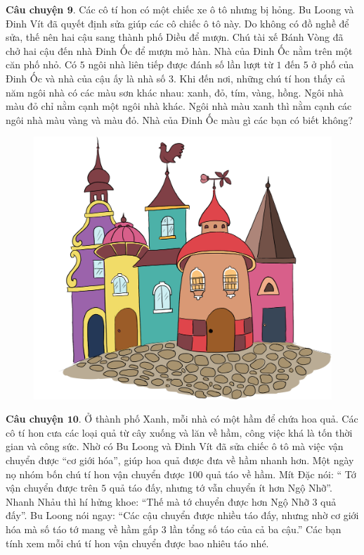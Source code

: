 	\vskip 0.1cm
	\textbf{\color{toancuabi}Câu chuyện $\pmb{9.}$} Các cô tí hon có một chiếc xe ô tô nhưng bị hỏng. Bu Loong và Đinh Vít đã quyết định sửa giúp các cô chiếc ô tô này. Do  không có đồ nghề để sửa, thế nên hai cậu sang thành phố Diều để mượn. Chú tài xế Bánh Vòng đã chở hai cậu đến nhà Đinh Ốc để mượn mỏ hàn. Nhà của Đinh Ốc nằm trên một căn phố nhỏ. Có $5$ ngôi nhà liên tiếp được đánh số lần lượt từ $1$ đến $5$ ở phố của Đinh Ốc và nhà của cậu ấy là nhà số $3$. Khi đến nơi, những chú tí hon thấy cả năm ngôi nhà có các màu sơn khác nhau: xanh, đỏ, tím, vàng, hồng. Ngôi nhà màu đỏ chỉ nằm cạnh một ngôi nhà khác. Ngôi nhà màu xanh thì nằm cạnh các ngôi nhà màu vàng và màu đỏ. Nhà của Đinh Ốc màu gì các bạn có biết không?
		\begin{figure}[H]
		\centering
		\vspace*{-5pt}
		\captionsetup{labelformat= empty, justification=centering}
		\includegraphics[width=0.55\linewidth]{Hinh24_NhaDinhOc}
		\vspace*{-10pt}
	\end{figure}
	\textbf{\color{toancuabi}Câu chuyện $\pmb{10.}$} Ở thành phố Xanh, mỗi nhà có một hầm để chứa hoa quả. Các cô tí hon cưa các loại quả từ cây xuống và lăn về hầm, công việc khá là tốn thời gian và công sức. Nhờ có Bu Loong và Đinh Vít đã sửa chiếc ô tô mà việc vận chuyển được “cơ giới hóa”, giúp hoa quả được đưa về hầm nhanh hơn. Một ngày nọ nhóm bốn chú tí hon vận chuyển được $100$ quả táo về hầm. Mít Đặc nói: “ Tớ vận chuyển được trên $5$ quả táo đấy, nhưng tớ vẫn chuyển ít hơn Ngộ Nhỡ”. Nhanh Nhảu thì hí hửng khoe: “Thế mà tớ chuyển được hơn Ngộ Nhỡ $3$ quả đấy”. Bu Loong nói ngay: “Các cậu chuyển được nhiều táo đấy, nhưng nhờ cơ giới hóa mà số táo tớ mang về hầm gấp $3$ lần tổng số táo của cả ba cậu.” Các bạn tính xem mỗi chú tí hon vận chuyển được bao nhiêu táo nhé.
